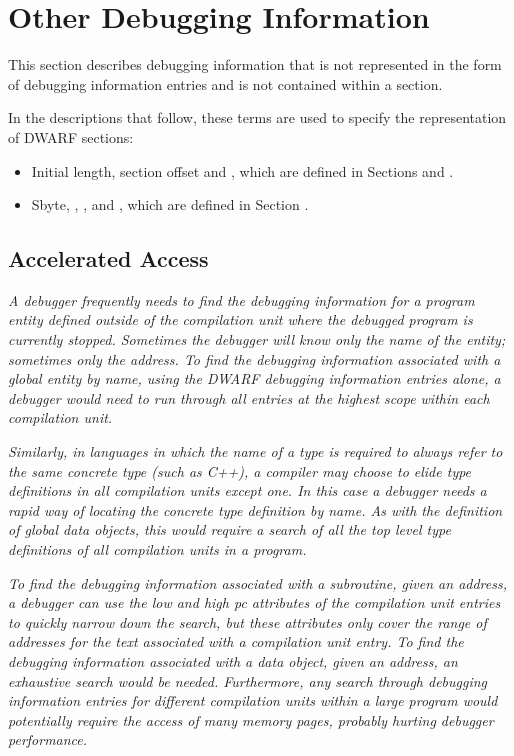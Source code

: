 \chapter{Other Debugging Information}
\label{chap:otherdebugginginformation}
This section describes debugging information that is not
represented in the form of debugging information entries and
is not contained within a \dotdebuginfo{} section.

In the descriptions that follow, these terms are used to
specify the representation of DWARF sections:
\begin{itemize}
\item
Initial length, section offset and 
, which are
defined in 
Sections  and 
.
\item
Sbyte, 
, 
, and 
, 
which 
are defined in 
Section .
\end{itemize}

\section{Accelerated Access}
\label{chap:acceleratedaccess}

\textit{A debugger frequently needs to find the debugging information
for a program entity defined outside of the compilation unit
where the debugged program is currently stopped. Sometimes the
debugger will know only the name of the entity; sometimes only
the address. To find the debugging information associated with
a global entity by name, using the DWARF debugging information
entries alone, a debugger would need to run through all
entries at the highest scope within each compilation unit.}

\textit{Similarly, in languages in which the name of a type is
required to always refer to the same concrete type (such as
C++), a compiler may choose to elide type definitions in
all compilation units except one. In this case a debugger
needs a rapid way of locating the concrete type definition
by name. As with the definition of global data objects, this
would require a search of all the top level type definitions
of all compilation units in a program.}

\textit{To find the debugging information associated with a subroutine,
given an address, a debugger can use the low and high pc
attributes of the compilation unit entries to quickly narrow
down the search, but these attributes only cover the range
of addresses for the text associated with a compilation unit
entry. To find the debugging information associated with a
data object, given an address, an exhaustive search would be
needed. Furthermore, any search through debugging information
entries for different compilation units within a large program
would potentially require the access of many memory pages,
probably hurting debugger performance.}

